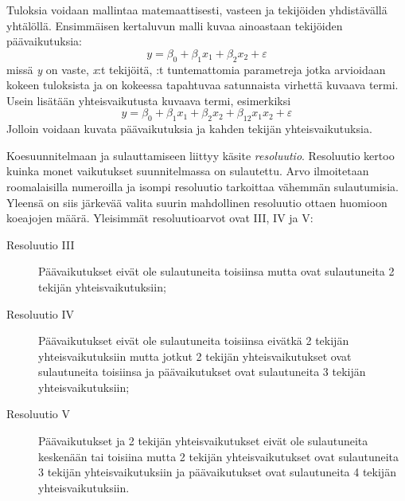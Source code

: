 \documentclass[12pt,a4paper,finnish]{tutthesis}
\begin{document}
Tuloksia voidaan mallintaa matemaattisesti, vasteen ja tekijöiden yhdistävällä
yhtälöllä. Ensimmäisen kertaluvun malli kuvaa ainoastaan tekijöiden päävaikutuksia:
\[y = \beta _0 + \beta _{1}x_1 + \beta _{2}x_2 + \varepsilon \]
missä \textit{y} on vaste, \textit{x}:t tekijöitä, \textit{ \beta }:t tuntemattomia parametreja
jotka arvioidaan kokeen tuloksista ja \textit{\varepsilon} on
kokeessa tapahtuvaa satunnaista virhettä kuvaava termi.
Usein lisätään yhteisvaikutusta kuvaava termi, esimerkiksi
\[y = \beta _0 + \beta _{1}x_1 + \beta _{2}x_2 + \beta _{12}x_{1}x_{2} + \varepsilon \]
Jolloin voidaan kuvata päävaikutuksia ja kahden tekijän yhteisvaikutuksia.



Koesuunnitelmaan ja sulauttamiseen liittyy käsite \textit{resoluutio}. Resoluutio
kertoo kuinka monet vaikutukset suunnitelmassa on sulautettu. Arvo ilmoitetaan
roomalaisilla numeroilla ja isompi resoluutio tarkoittaa vähemmän sulautumisia.
Yleensä on siis järkevää valita suurin mahdollinen resoluutio ottaen huomioon
koeajojen määrä. Yleisimmät resoluutioarvot ovat III, IV ja V:

\begin{description}
\item[Resoluutio III] Päävaikutukset eivät ole sulautuneita toisiinsa
mutta ovat sulautuneita 2 tekijän yhteisvaikutuksiin;
\item[Resoluutio IV] Päävaikutukset eivät ole sulautuneita toisiinsa eivätkä 2 tekijän
yhteisvaikutuksiin mutta jotkut 2 tekijän yhteisvaikutukset ovat sulautuneita toisiinsa
ja päävaikutukset ovat sulautuneita 3 tekijän yhteisvaikutuksiin;
\item[Resoluutio V] Päävaikutukset ja 2 tekijän yhteisvaikutukset eivät ole sulautuneita
keskenään tai toisiina mutta 2 tekijän yhteisvaikutukset ovat sulautuneita 3 tekijän
yhteisvaikutuksiin ja päävaikutukset ovat sulautuneita 4 tekijän yhteisvaikutuksiin. \parencite[s.~9]{montgomery2006}
\end{description}
\end{document}

